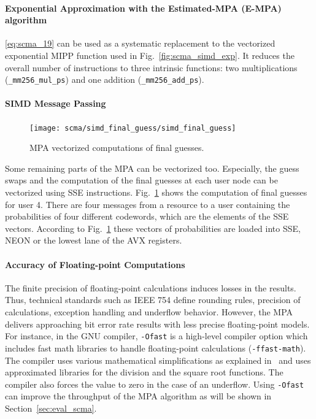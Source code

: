 \paragraph{Exponential Approximation with the Estimated-MPA (E-MPA) algorithm}

\eqref{eq:scma_19} can be used as a systematic replacement to the vectorized
exponential MIPP function used in Fig.~\ref{fig:scma_simd_exp}. It reduces the
overall number of instructions to three intrinsic functions: two multiplications
(\verb|_mm256_mul_ps|) and one addition (\verb|_mm256_add_ps|).

\paragraph{SIMD Message Passing}

\begin{figure}[htp]
  \centering
  \texttt{[image: scma/simd\_final\_guess/simd\_final\_guess]}
  \caption {MPA vectorized computations of final guesses.}
  \label{fig:scma_simd_final_guess}
\end{figure}

Some remaining parts of the MPA can be vectorized too. Especially, the guess
swaps and the computation of the final guesses at each user node can be
vectorized using SSE instructions. Fig.~\ref{fig:scma_simd_final_guess} shows
the computation of final guesses for user 4. There are four messages from a
resource to a user containing the probabilities of four different codewords,
which are the elements of the SSE vectors. According to
Fig.~\ref{fig:scma_simd_final_guess} these vectors of probabilities are loaded
into SSE, NEON or the lowest lane of the AVX registers.

\paragraph{Accuracy of Floating-point Computations}
\label{sec:opt_scma_float}

The finite precision of floating-point calculations induces losses in the
results. Thus, technical standards such as IEEE 754 define rounding rules,
precision of calculations, exception handling and underflow behavior. However,
the MPA delivers approaching bit error rate results with less precise
floating-point models. For instance, in the GNU compiler, \verb|-Ofast| is a
high-level compiler option which includes fast math libraries to handle
floating-point calculations (\verb|-ffast-math|). The compiler uses various
mathematical simplifications as explained in~\cite{Gccfp2018} and uses
approximated libraries for the division and the square root functions. The
compiler also forces the value to zero in the case of an underflow. Using
\verb|-Ofast| can improve the throughput of the MPA algorithm as will be shown
in Section~\ref{sec:eval_scma}.

